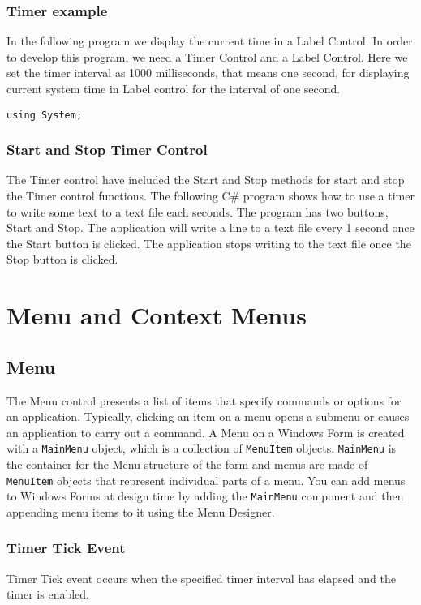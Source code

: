 \subsubsection*{Timer example}
In the following program we display the current time in a Label Control. In order to develop this program, we need a Timer Control and a Label Control. Here we set the timer interval as 1000 milliseconds, that means one second, for displaying current system time in Label control for the interval of one second.

\begin{lstlisting}[numbers=none]
using System;
\end{lstlisting}

\subsubsection*{Start and Stop Timer Control}
The Timer control have included the Start and Stop methods for start and stop the Timer control functions. The following C\# program shows how to use a timer to write some text to a text file each seconds. The program has two buttons, Start and Stop. The application will write a line to a text file every 1 second once the Start button is clicked. The application stops writing to the text file once the Stop button is clicked.



\section{Menu and Context Menus}
\subsection{Menu}
The Menu control presents a list of items that specify commands or options for an application.
Typically, clicking an item on a menu opens a submenu or causes an application to carry out a
command. A Menu on a Windows Form is created with a \texttt{MainMenu} object, which is a collection
of \texttt{MenuItem} objects. \texttt{MainMenu} is the container for the Menu structure of the form and menus are
made of \texttt{MenuItem} objects that represent individual parts of a menu. You can add menus to
Windows Forms at design time by adding the \texttt{MainMenu} component and then appending menu
items to it using the Menu Designer.

\subsubsection*{Timer Tick Event}
Timer Tick event occurs when the specified timer interval has elapsed and the timer is enabled.

